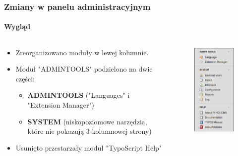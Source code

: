 
\begin{frame}[fragile]
	\frametitle{Zmiany w panelu administracyjnym}
	\framesubtitle{Wygląd}

	\begin{columns}[T]

		\begin{column}{.5\textwidth}

			\begin{itemize}
				\item Zreorganizowano moduły w lewej kolumnie.
				\item Moduł "ADMINTOOLS" podzielono na dwie części:

					\begin{itemize}
						\item \textbf{ADMINTOOLS} ("Languages" i "Extension Manager")
						\item \textbf{SYSTEM} (niskopoziomowe narzędzia, które nie pokazują 3-kolumnowej strony)
					\end{itemize}

				\item Usunięto przestarzały moduł "TypoScript Help" 

			\end{itemize}

		\end{column}

		\begin{column}{.5\textwidth}
			\begin{figure}\vspace*{-0.4cm}
				\includegraphics[width=0.35\linewidth]{Images/BackendChanges/AdminTools.png}
			\end{figure}
		\end{column}

	\end{columns}

\end{frame}


